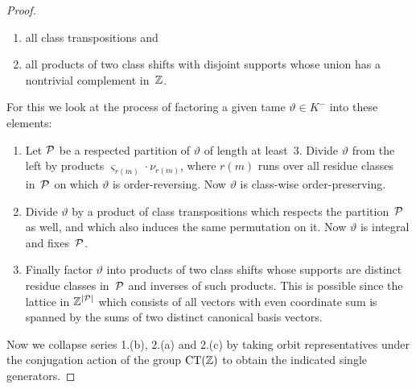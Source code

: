 \documentclass{amsart}
\theoremstyle{definition} \newtheorem{CTZDefinition}{Definition}[section]
\theoremstyle{plain}      \newtheorem{CTZPropertiesTheorem}[CTZDefinition]{Theorem}
\theoremstyle{plain}      \newtheorem{CTZSubgroupsTheorem}[CTZDefinition]{Theorem}
\theoremstyle{definition} \newtheorem{RcwaMappingDefinition}{Definition}[section]
\theoremstyle{definition} \newtheorem{RCWADefinition}[RcwaMappingDefinition]{Definition}
\theoremstyle{plain}      \newtheorem{CTZNotFinitelyGeneratedTheorem}
\theoremstyle{definition} \newtheorem{CTZSmEmbeddingDefinition}[RcwaMappingDefinition]{Definition}
\theoremstyle{plain}      \newtheorem{CTZHighlyTransitiveTheorem}[RcwaMappingDefinition]{Theorem}
\theoremstyle{plain}      \newtheorem{CTZTorsionElementsDivisibleTheorem}
\theoremstyle{plain}      \newtheorem{CTLemma}{Lemma}[section]
\theoremstyle{plain}      \newtheorem{IntegralCommutatorLemma}[CTLemma]{Lemma}
\theoremstyle{plain}      \newtheorem{NormalSubgroupContainsIntegralElementLemma}[CTLemma]{Lemma}
\theoremstyle{plain}      \newtheorem{CTZSimpleTheorem}[CTLemma]{Theorem}
\theoremstyle{remark}     \newtheorem{CTZSimpleRemark}[CTLemma]{Remark}
\theoremstyle{definition} \newtheorem{CTPZDefinition}[CTLemma]{Definition}
\theoremstyle{plain}      \newtheorem{CTPZSimpleCorollary}[CTLemma]{Corollary}
\theoremstyle{plain}      \newtheorem{CTPZSimpleProblem}[CTLemma]{Problem}
\theoremstyle{plain}      \newtheorem{FnPSL2ZEmbeddingTheorem}{Theorem}[section]
\theoremstyle{plain}      \newtheorem{FreeProductEmbeddingTheorem}[FnPSL2ZEmbeddingTheorem]{Theorem}
\theoremstyle{definition} \newtheorem{RestrictionMonomorphismDefinition}
\theoremstyle{plain}      \newtheorem{DirectAndWreathProductsEmbeddingTheorem}
\theoremstyle{plain}      \newtheorem{DirectAndWreathProductsEmbeddingCorollary}
\theoremstyle{definition} \newtheorem{CTintZDefinition}[FnPSL2ZEmbeddingTheorem]{Definition}
\theoremstyle{plain}      \newtheorem{CTintZSimpleTheorem}[FnPSL2ZEmbeddingTheorem]{Theorem}
\theoremstyle{definition} \newtheorem{KernelDefinition}{Definition}[section]
\theoremstyle{definition} \newtheorem{TameWildDefinition}[KernelDefinition]{Definition}
\theoremstyle{definition} \newtheorem{SimpleSupergroupsDefinition}[KernelDefinition]{Definition}
\theoremstyle{definition} \newtheorem{CSCRDefinition}[KernelDefinition]{Definition}
\theoremstyle{plain}      \newtheorem{SimpleSupergroupsGeneratorsTheorem}[KernelDefinition]{Theorem}
\theoremstyle{plain}      \newtheorem{SimpleSupergroupsTheorem}[KernelDefinition]{Theorem}
\theoremstyle{plain}      \newtheorem{SimpleSupergroupsTransitivityTheorem}
\theoremstyle{plain}      \newtheorem{TameGenerationConjecture}[KernelDefinition]{Conjecture}
\theoremstyle{remark}     \newtheorem{TameGenerationRemark}[KernelDefinition]{Remark}
\begin{document}
\begin{proof}
\begin{enumerate}
\begin{enumerate}
            \item all class transpositions and

            \item all products of two class shifts with disjoint supports whose union has
                  a non\-trivial complement in~\(\mathbb{Z}\).

          \end{enumerate}
          For this we look at the process of factoring a given tame \(\vartheta \in K^-\)
          into these elements:
          \begin{enumerate}[{ad} (a)]

            \item Let \(\mathcal{P}\) be a respected partition of \(\vartheta\) of length at least~3.
                  Divide \(\vartheta\) from the left by products \(\varsigma_{r(m)} \cdot
                  \nu_{r(m)}\), where \(r(m)\) runs over all residue classes in~\(\mathcal{P}\) on
                  which \(\vartheta\) is order-reversing. Now \(\vartheta\) is class-wise
                  order-preserving.

            \item Divide \(\vartheta\) by a product of class transpositions which respects the
                  partition~\(\mathcal{P}\) as well, and which also induces the same permutation on it.
                  Now \(\vartheta\) is integral and fixes~\(\mathcal{P}\).

            \item Finally factor \(\vartheta\) into products of two class shifts whose supports
                  are distinct residue classes in~\(\mathcal{P}\) and inverses of such products.
                  This is possible since the lattice in \(\mathbb{Z}^{|\mathcal{P}|}\) which consists of
                  all vectors with even coordinate sum is spanned by the sums of two distinct
                  canonical basis vectors.

          \end{enumerate}

  \end{enumerate}
  Now we collapse series 1.(b), 2.(a) and 2.(c) by taking orbit representatives under
  the conjugation action of the group \(\CT{\ZZ}\) to obtain the indicated single generators.
\end{proof}

\goodbreak
\end{document}
